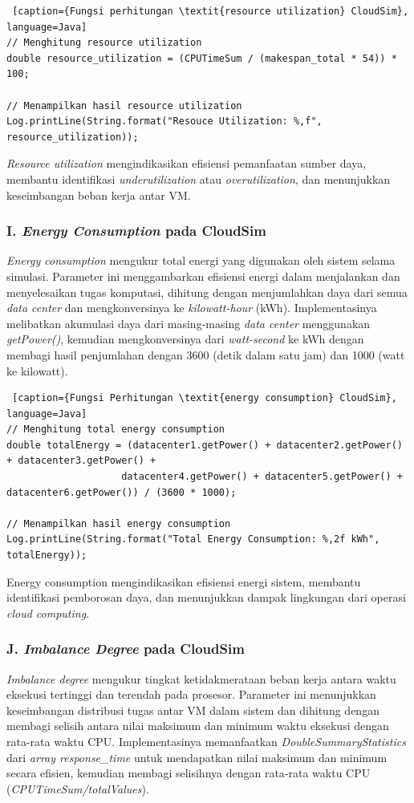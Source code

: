 \begin{lstlisting} [caption={Fungsi perhitungan \textit{resource utilization} CloudSim}, language=Java]
// Menghitung resource utilization
double resource_utilization = (CPUTimeSum / (makespan_total * 54)) * 100;

// Menampilkan hasil resource utilization
Log.printLine(String.format("Resouce Utilization: %,f", resource_utilization));
\end{lstlisting}

\textit{Resource utilization} mengindikasikan efisiensi pemanfaatan sumber daya, membantu identifikasi \textit{underutilization} atau \textit{overutilization}, dan menunjukkan keseimbangan beban kerja antar VM.

\subsubsection{I. \textit{Energy Consumption} pada CloudSim}
\textit{Energy consumption} mengukur total energi yang digunakan oleh sistem selama simulasi. Parameter ini menggambarkan efisiensi energi dalam menjalankan dan menyelesaikan tugas komputasi, dihitung dengan menjumlahkan daya dari semua \textit{data center} dan mengkonversinya ke \textit{kilowatt-hour} (kWh). Implementasinya melibatkan akumulasi daya dari masing-masing \textit{data center} menggunakan \textit{getPower()}, kemudian mengkonversinya dari \textit{watt-second} ke kWh dengan membagi hasil penjumlahan dengan 3600 (detik dalam satu jam) dan 1000 (watt ke kilowatt). 

\begin{lstlisting} [caption={Fungsi Perhitungan \textit{energy consumption} CloudSim}, language=Java]
// Menghitung total energy consumption
double totalEnergy = (datacenter1.getPower() + datacenter2.getPower() + datacenter3.getPower() + 
                    datacenter4.getPower() + datacenter5.getPower() + datacenter6.getPower()) / (3600 * 1000);

// Menampilkan hasil energy consumption
Log.printLine(String.format("Total Energy Consumption: %,2f kWh", totalEnergy));
\end{lstlisting}

Energy consumption mengindikasikan efisiensi energi sistem, membantu identifikasi pemborosan daya, dan menunjukkan dampak lingkungan dari operasi \textit{cloud computing}.

\subsubsection{J. \textit{Imbalance Degree} pada CloudSim}
\textit{Imbalance degree} mengukur tingkat ketidakmerataan beban kerja antara waktu eksekusi tertinggi dan terendah pada prosesor. Parameter ini menunjukkan keseimbangan distribusi tugas antar VM dalam sistem dan dihitung dengan membagi selisih antara nilai maksimum dan minimum waktu eksekusi dengan rata-rata waktu CPU. Implementasinya memanfaatkan \textit{DoubleSummaryStatistics} dari \textit{array response\_time} untuk mendapatkan nilai maksimum dan minimum secara efisien, kemudian membagi selisihnya dengan rata-rata waktu CPU (\textit{CPUTimeSum/totalValues}). 

